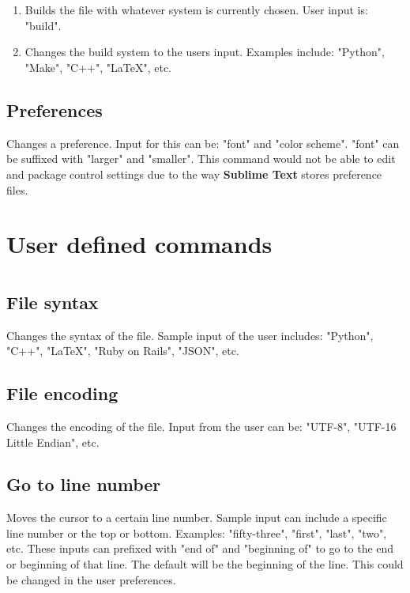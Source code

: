 \documentclass[11pt, oneside]{article}
\begin{document}
\section{}

	\begin{enumerate}
	\item {}
	Builds the file with whatever system is currently chosen. User input is: "build".

	\item {}
	Changes the build system to the users input. Examples include: "Python", "Make", "C++", "\LaTeX", etc.
	\end{enumerate}

\subsection{Preferences}
	Changes a preference. Input for this can be: "font" and  "color scheme". "font" can be suffixed with "larger" and "smaller". This command would not be able to edit and package control settings due to the way \textbf{Sublime Text} stores preference files. 

\section{User defined commands}


\section{}

	\subsection{File syntax}
	Changes the syntax of the file. Sample input of the user includes: "Python", "C++", "\LaTeX", "Ruby on Rails", "JSON", etc.

	\subsection{File encoding}
	Changes the encoding of the file. Input from the user can be: "UTF-8", "UTF-16 Little Endian", etc.

	\subsection{Go to line number}
	Moves the cursor to a certain line number. Sample input can include a specific line number or the top or bottom. Examples: "fifty-three", "first", "last", "two", etc. These inputs can prefixed with "end of" and "beginning of" to go to the end or beginning of that line. The default will be the beginning of the line. This could be changed in the user preferences.
\end{document}
